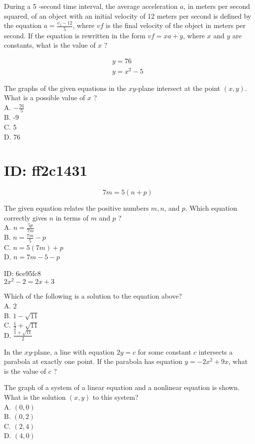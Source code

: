 During a 5 -second time interval, the average acceleration $a$, in meters per second squared, of an object with an initial velocity of 12 meters per second is defined by the equation $a=\frac{v_{f}-12}{5}$, where $v f$ is the final velocity of the object in meters per second. If the equation is rewritten in the form $v f=x a+y$, where $x$ and $y$ are constants, what is the value of $x$ ?

$$
\begin{gathered}
y=76 \\
y=x^{2}-5
\end{gathered}
$$

The graphs of the given equations in the $x y$-plane intersect at the point $(x, y)$. What is a possible value of $x$ ?\\
A. $-\frac{76}{5}$\\
B. -9\\
C. 5\\
D. 76

\section*{ID: ff2c1431}
$$
7 m=5(n+p)
$$

The given equation relates the positive numbers $m, n$, and $p$. Which equation correctly gives $n$ in terms of $m$ and $p$ ?\\
A. $n=\frac{5 p}{7 m}$\\
B. $n=\frac{7 m}{5}-p$\\
C. $n=5(7 m)+p$\\
D. $n=7 m-5-p$

ID: 6ce95fc8\\
$2 x^{2}-2=2 x+3$

Which of the following is a solution to the equation above?\\
A. 2\\
B. $1-\sqrt{11}$\\
C. $\frac{1}{2}+\sqrt{11}$\\
D. $\frac{1+\sqrt{11}}{2}$

In the $x y$-plane, a line with equation $2 y=c$ for some constant $c$ intersects a parabola at exactly one point. If the parabola has equation $y=-2 x^{2}+9 x$, what is the value of $c$ ?\\


The graph of a system of a linear equation and a nonlinear equation is shown. What is the solution $(x, y)$ to this system?\\
A. $(0,0)$\\
B. $(0,2)$\\
C. $(2,4)$\\
D. $(4,0)$

